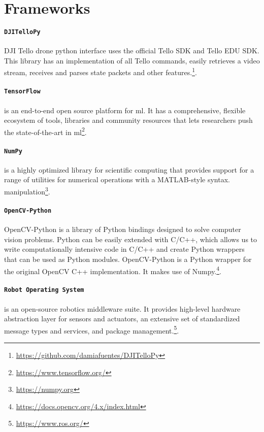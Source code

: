 \section{Frameworks}
\label{subsec:frameworks}

\paragraph*{\texttt{DJITelloPy}} DJI Tello drone python interface uses the official Tello SDK and Tello EDU SDK. This library has an implementation of all Tello commands, easily retrieves a video stream, receives and parses state packets and other features.\footnote{\url{https://github.com/damiafuentes/DJITelloPy}}.

\paragraph*{\texttt{TensorFlow}} is an end-to-end open source platform for \gls{ml}. It has a comprehensive, flexible ecosystem of tools, libraries and community resources that lets researchers push the state-of-the-art in \gls{ml}\footnote{\url{https://www.tensorflow.org/}}.

\paragraph*{\texttt{NumPy}} is a highly optimized library for scientific computing that provides support for a range of utilities for numerical operations with a MATLAB-style syntax. manipulation\footnote{\url{https://numpy.org}}.

\paragraph*{\texttt{OpenCV-Python}} OpenCV-Python is a library of Python bindings designed to solve computer vision problems. Python can be easily extended with C/C++, which allows us to write computationally intensive code in C/C++ and create Python wrappers that can be used as Python modules. OpenCV-Python is a Python wrapper for the original OpenCV C++ implementation. It makes use of Numpy.\footnote{\url{https://docs.opencv.org/4.x/index.html}}.

\paragraph*{\texttt{Robot Operating System}} is an open-source robotics middleware suite. It provides high-level hardware abstraction layer for sensors and actuators, an extensive set of standardized message types and services, and package management.\footnote{\url{https://www.ros.org/}}.


